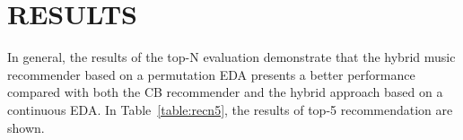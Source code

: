 \documentclass{article}
\begin{document}
\section{RESULTS}
\label{sec:typestyle}
In general, the results of the top-N evaluation demonstrate that the hybrid music recommender based on a permutation EDA presents a better performance compared with both the CB recommender and the hybrid approach based on a continuous EDA. In Table~\ref{table:recn5}, the results of top-5 recommendation are shown.
\begin{table}[htb]
	
	\caption{Evaluation of recommender systems (N=5)} %
	\label{table:recn5} %
\end{table}
\end{document}
